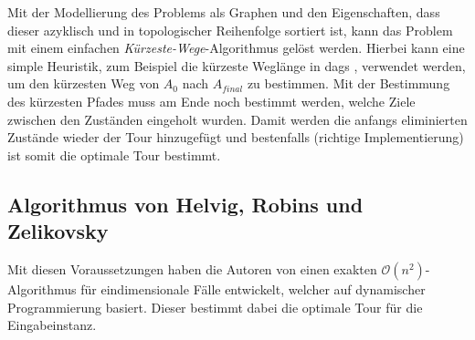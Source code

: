 \documentclass[german,version-2019-11]{uzl-thesis}
\begin{document}
Mit der Modellierung des Problems als Graphen und den Eigenschaften, dass dieser azyklisch und in topologischer Reihenfolge sortiert ist, kann das Problem mit einem einfachen \emph{Kürzeste-Wege}-Algorithmus gelöst werden. Hierbei kann eine simple Heuristik, zum Beispiel die kürzeste Weglänge in dags \cite{brandstadt1994kurzeste}, verwendet werden, um den kürzesten Weg von $A_0$ nach $A_{final}$ zu bestimmen. Mit der Bestimmung des kürzesten Pfades muss am Ende noch bestimmt werden, welche Ziele zwischen den Zuständen eingeholt wurden. Damit werden die anfangs eliminierten Zustände wieder der Tour hinzugefügt und bestenfalls (richtige Implementierung) ist somit die optimale Tour bestimmt. 

\subsection{Algorithmus von Helvig, Robins und Zelikovsky}

Mit diesen Voraussetzungen haben die Autoren von \cite{helvig} einen exakten $\mathcal{O}(n^2)$-Algorithmus für eindimensionale Fälle entwickelt, welcher auf dynamischer Programmierung basiert. Dieser bestimmt dabei die optimale Tour für die Eingabeinstanz. 
\end{document}
